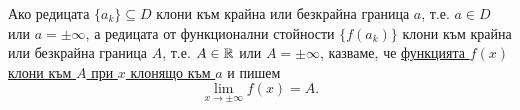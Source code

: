 \documentclass[numbers=endperiod, DIV=15, bibliography=totocnumbered]{scrartcl}
\begin{document}
\begin{definition}
  Ако редицата $\{ a_k \} \subseteq D$ клони към крайна или безкрайна граница $a$, т.е. $a \in D$ или $a = \pm \infty$, а редицата от функционални стойности $\{ f(a_k) \}$ клони към крайна или безкрайна граница $A$, т.е. $A \in \mathbb{R}$ или $A = \pm \infty$, казваме, че \uline{функцията $f(x)$ клони към $A$ при $x$ клонящо към $a$} и пишем
  \begin{displaymath}
    \lim_{x \to \pm \infty} f(x) = A.
  \end{displaymath}
\end{definition}

\printbibliography
\end{document}

